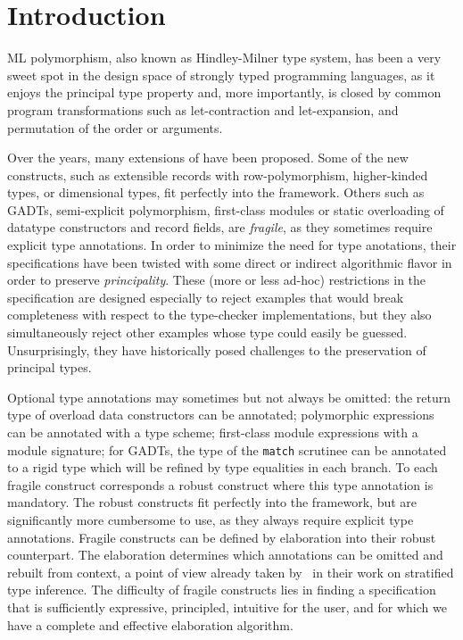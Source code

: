 \documentclass[acmsmall,screen,nonacm]{acmart}
\begin{document}
\section{Introduction}

ML polymorphism, also known as Hindley-Milner type system, has been a very
sweet spot in the design space of strongly typed programming languages, as
it enjoys the principal type property and, more importantly, is closed by
common program transformations such as let-contraction and let-expansion,
and permutation of the order or arguments.

Over the years, many extensions of \ML have been proposed. Some of the new
constructs, such as extensible records with row-polymorphism, higher-kinded
types, or dimensional types, fit perfectly into the \ML framework. Others
such as GADTs, semi-explicit polymorphism, first-class modules or static
overloading of datatype constructors and record fields, are
\emph{fragile}, as they sometimes require explicit type
annotations.
In order to minimize the need for type anotations, their specifications have
been twisted with some direct or indirect algorithmic flavor in order to
preserve \emph{principality}.
%
These (more or less ad-hoc) restrictions in the specification are designed
especially to reject examples that would break completeness with respect to
the type-checker implementations, but they also simultaneously reject other
examples whose type could easily be guessed.  Unsurprisingly, they have historically posed
challenges to the preservation of principal types.

Optional type annotations may sometimes but not always be omitted: the
return type of overload data constructors can be annotated; polymorphic
expressions can be annotated with a type scheme; first-class module
expressions with a module signature; for GADTs, the type of the
\texttt{match} scrutinee can be annotated to a rigid type which will be
refined by type equalities in each branch. To each fragile construct
corresponds a robust construct where this type annotation is mandatory. The
robust constructs fit perfectly into the \ML framework, but are
significantly more cumbersome to use, as they always require explicit type
annotations.  Fragile constructs can be defined by elaboration into their
robust counterpart. The elaboration determines which annotations can be
omitted and rebuilt from context, a point of view already taken by~\citet
{Pottier-Regis-Gianas/stratified@popl06} in their work on stratified type
inference.
%
The difficulty of fragile constructs lies in finding a specification
that is sufficiently expressive, principled, intuitive for the user,
and for which we have a complete and effective elaboration algorithm.
\end{document}
